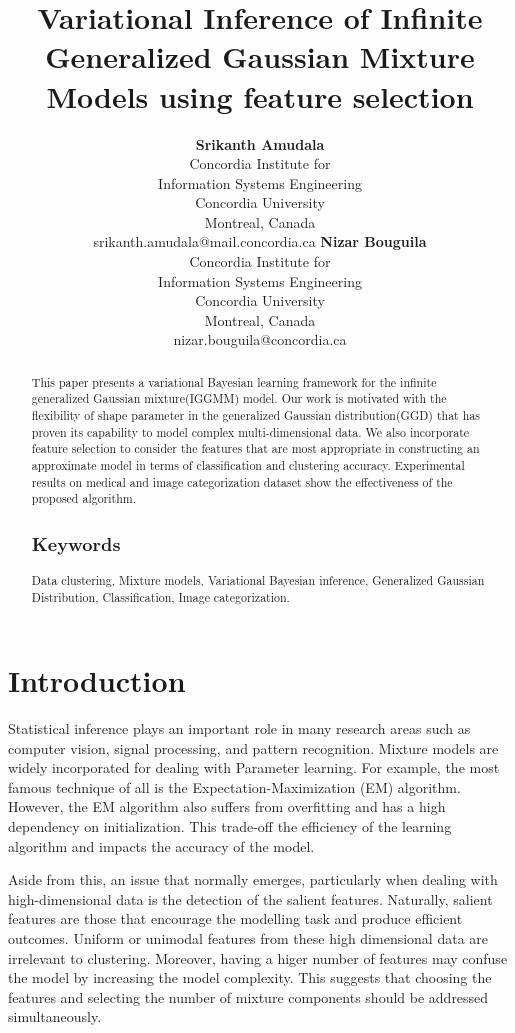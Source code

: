 \documentclass[letterpaper]{article}
\title{Variational Inference of Infinite Generalized Gaussian Mixture Models using feature selection}
\author{} %
\author{ {\bf Srikanth Amudala} \\
Concordia Institute for \\Information Systems Engineering \\
Concordia University\\
Montreal, Canada\\srikanth.amudala@mail.concordia.ca 
\And
{\bf Nizar Bouguila}  \\
Concordia Institute for \\Information Systems Engineering \\
Concordia University\\
Montreal, Canada\\nizar.bouguila@concordia.ca
}
\begin{document}
\maketitle

\begin{abstract}
This paper presents a variational Bayesian learning
framework for the infinite generalized Gaussian mixture(IGGMM)
model. Our work is motivated with the flexibility of shape parameter in the generalized Gaussian distribution(GGD) that has proven its capability to model complex multi-dimensional
data. We also incorporate feature selection to consider the features that are most appropriate in constructing an approximate model in terms of classification and clustering accuracy. 
Experimental results on medical and image categorization dataset show the effectiveness of the proposed algorithm.
\subsection*{\textbf{Keywords}}
Data clustering, Mixture models, Variational Bayesian inference,
Generalized Gaussian Distribution, Classification, Image categorization.
\end{abstract}

\section{Introduction}
Statistical inference plays an important role in many research
areas such as computer vision, signal processing, and pattern
recognition.
Mixture models are widely incorporated for dealing with Parameter learning. 
For example, 
the most famous technique\cite{bouguila2006unsupervised} of all is the Expectation-Maximization (EM) algorithm. However, the EM algorithm also suffers from overfitting and has a high dependency on initialization\cite{stauffer1999adaptive}. 
This trade-off the efficiency of the learning algorithm and impacts the accuracy of the model.

Aside from this, an issue that normally emerges, particularly when dealing with high-dimensional 
data is the detection of the salient features. Naturally, salient features are those that encourage 
the modelling task and produce efficient outcomes. 
Uniform or unimodal features from these high dimensional data are irrelevant to clustering. Moreover, having a higer number of features may confuse the model by increasing the model complexity\cite{harrison1998organizational}\cite{law2004simultaneous}. 
This suggests that choosing the features and selecting the number of mixture components should be
addressed simultaneously.
\end{document}
